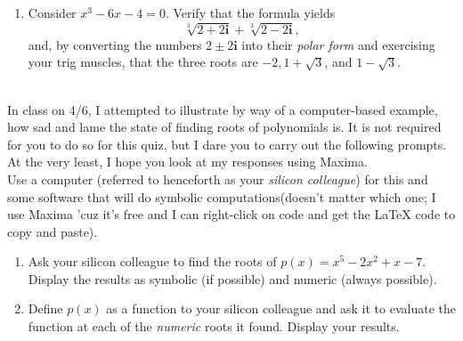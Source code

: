 \documentclass[10pt]{article}
\begin{document}
\begin{enumerate}
            

        

		\item Consider $x^3 - 6x - 4 = 0$.  Verify that the formula yields 
		$$\sqrt[3]{2+2{\mathbf i}} + \sqrt[3]{2 - 2{\mathbf{i}}},$$
		and, by converting the numbers $2 \pm 2 \mathbf{i}$ into their \emph{polar form} and exercising your trig muscles, that the three roots are $-2, 1+ \sqrt{3}$, and $1-\sqrt{3}$.  
		
	\end{enumerate}
	
		\\
	
	\noindent In class on 4/6, I attempted to illustrate by way of a computer-based example, how sad and lame the state of finding roots of polynomials is. 
	It is not required for you to do so for this quiz, but I dare you to carry out the following prompts.  
	At the very least, I hope you look at my responses using Maxima.\\
	
	
	\noindent Use a computer (referred to henceforth as your \emph{silicon colleague}) for this and 
	some software that will do symbolic computations(doesn't matter which one; I use Maxima 'cuz it's free and I can right-click on code and get the LaTeX code to copy and paste).  
	
	\begin{enumerate}
		\item Ask your silicon colleague to find the roots of $p(x) = x^5 -2x^2 + x -7$.
		Display the results as symbolic (if possible) and numeric (always possible). 
		
		\item Define $p(x)$ as a function to your silicon colleague and ask it to evaluate the function at each of the \emph{numeric} roots it found.  Display your results. 
	\end{enumerate}
	
	



\noindent \underline{\hspace{3in}}\\
\end{document}
